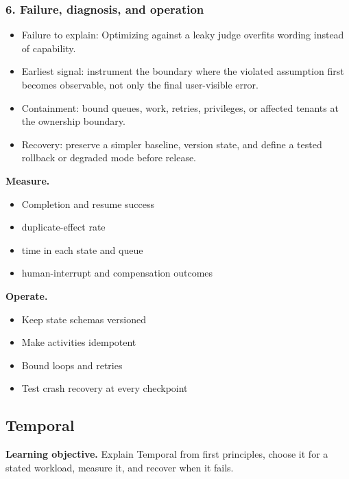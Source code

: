 \subsubsection*{6. Failure, diagnosis, and operation}
\begin{itemize}
\item Failure to explain: Optimizing against a leaky judge overfits wording instead of capability.
\item Earliest signal: instrument the boundary where the violated assumption first becomes observable, not only the final user-visible error.
\item Containment: bound queues, work, retries, privileges, or affected tenants at the ownership boundary.
\item Recovery: preserve a simpler baseline, version state, and define a tested rollback or degraded mode before release.
\end{itemize}
\textbf{Measure.}\begin{itemize}
\item Completion and resume success
\item duplicate-effect rate
\item time in each state and queue
\item human-interrupt and compensation outcomes
\end{itemize}
\textbf{Operate.}\begin{itemize}
\item Keep state schemas versioned
\item Make activities idempotent
\item Bound loops and retries
\item Test crash recovery at every checkpoint
\end{itemize}
\subsection{Temporal}
\textbf{Learning objective.} Explain Temporal from first principles, choose it for a stated workload, measure it, and recover when it fails.

